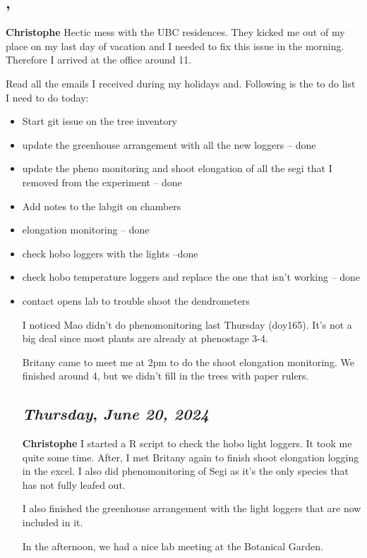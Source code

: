 \subsection*{\weekday, \day}
\textbf {Christophe}
Hectic mess with the UBC residences. They kicked me out of my place on my last day of vacation and I needed to fix this issue in the morning. Therefore I arrived at the office around 11. 
\par Read all the emails I received during my holidays and. Following is the to do list I need to do today:
\begin {itemize}
	\item Start git issue on the tree inventory
	\item update the greenhouse arrangement with all the new loggers -- done
	\item update the pheno monitoring and shoot elongation of all the segi that I removed from the experiment -- done
	\item Add notes to the labgit on chambers
	\item elongation monitoring -- done
	\item check hobo loggers with the lights --done 
	\item check hobo temperature loggers and replace the one that isn't working -- done 
	\item contact opens lab to trouble shoot the dendrometers

I noticed Mao didn't do phenomonitoring last Thursday (doy165). It's not a big deal since most plants are already at phenostage 3-4.
\par Britany came to meet me at 2pm to do the shoot elongation monitoring. We finished around 4, but we didn't fill in the trees with paper rulers. 

\def\day{\textit{June 20, 2024}}
\def\weekday{\textit{Thursday}}
\subsection*{\weekday, \day}
\textbf {Christophe}
I started a R script to check the hobo light loggers. It took me quite some time. After, I met Britany again to finish shoot elongation logging in the excel. I also did phenomonitoring of Segi as it's the only species that has not fully leafed out. 
\par I also finished the greenhouse arrangement with the light loggers that are now included in it. 
\par In the afternoon, we had a nice lab meeting at the Botanical Garden. 


\end{itemize}
